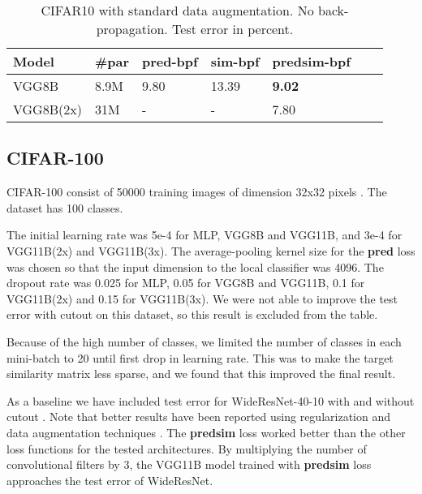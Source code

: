 \documentclass{article}
\begin{document}
\begin{table}[h]
  \caption{CIFAR10 with standard data augmentation. No back-propagation. Test error in percent.}
  \label{table:cifar10-bio}
  \centering
  \begin{tabular}{lllllll}
    \toprule
    Model       & \#par & pred-bpf & sim-bpf & predsim-bpf  \\
    \midrule
    VGG8B       & 8.9M & 9.80 & 13.39  & \textbf{9.02} \\
    VGG8B(2x)   & 31M & - & -  & 7.80 \\
    \bottomrule
  \end{tabular}
\end{table}

\subsection{CIFAR-100}

CIFAR-100 consist of 50000 training images of dimension 32x32 pixels \cite{Krizhevsky09}. The dataset has 100 classes. 

The initial learning rate was 5e-4 for MLP, VGG8B and VGG11B, and 3e-4 for VGG11B(2x) and VGG11B(3x). The average-pooling kernel size for the \textbf{pred} loss was chosen so that the input dimension to the local classifier was 4096. The dropout rate was 0.025 for MLP, 0.05 for VGG8B and VGG11B, 0.1 for VGG11B(2x) and 0.15 for VGG11B(3x). We were not able to improve the test error with cutout on this dataset, so this result is excluded from the table. 

Because of the high number of classes, we limited the number of classes in each mini-batch to 20 until first drop in learning rate. This was to make the  target similarity matrix  less sparse, and we found that this improved the final result.

As a baseline we have included test error for WideResNet-40-10 with and without cutout \cite{DevriesT17}. Note that better results have been reported using regularization and data augmentation techniques  \cite{YamadaIK18,CubukZMVL18}. The \textbf{predsim} loss worked better than the other loss functions for the tested architectures. By multiplying the number of convolutional filters by 3, the VGG11B model trained with \textbf{predsim} loss approaches the test error of WideResNet.
\end{document}
